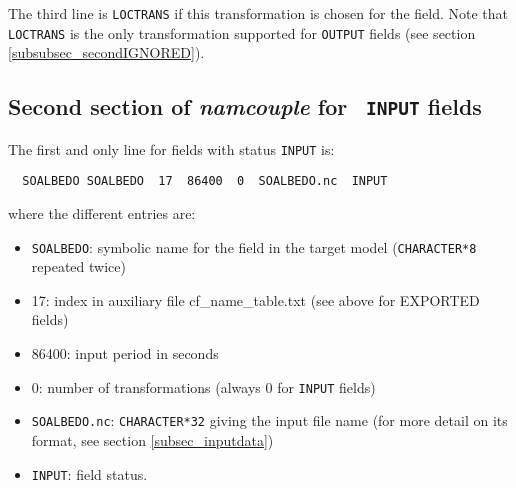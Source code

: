 The third line is {\tt LOCTRANS} if this transformation is chosen for
the field. Note that {\tt LOCTRANS} is the only transformation
supported for {\tt OUTPUT} fields (see section
\ref{subsubsec_secondIGNORED}).

\subsection{Second section of {\it namcouple} for {\tt
  INPUT} fields}
\label{subsubsec_secondINPUT}

  The first and only line for fields with status {\tt INPUT} is:

  \begin{verbatim}
  SOALBEDO SOALBEDO  17  86400  0  SOALBEDO.nc  INPUT\end{verbatim} where the different entries are:
  \begin{itemize}
  \item  {\tt SOALBEDO}: symbolic name for the field in the target
  model ({\tt CHARACTER*8} repeated twice)
  \item 17:  index in auxiliary file cf\_name\_table.txt (see above for EXPORTED fields)
  \item 86400: input period in seconds
  \item 0: number of transformations (always 0 for {\tt INPUT} fields)
  \item {\tt SOALBEDO.nc}: {\tt CHARACTER*32} giving the input file
  name (for more detail on its format, see section
  \ref{subsec_inputdata})
  \item {\tt INPUT}: field status.
  \end{itemize}

